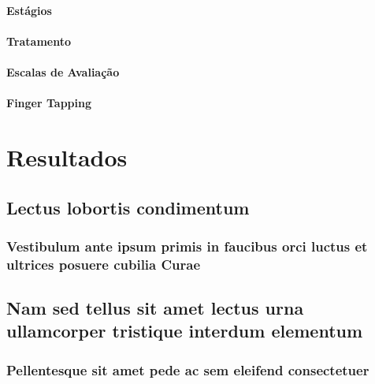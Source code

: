 \documentclass[
	12pt,				%
	openany,			%
	oneside,			%
	a4paper,			%
	english,			%
	french,				%
	spanish,			%
	brazil				%
	]{abntex2}
\begin{document}
\subsection{Estágios}
\subsection{Tratamento}
\subsection{Escalas de Avaliação}

\subsection{Finger Tapping}

\part{Resultados}

\chapter{Lectus lobortis condimentum}

\section{Vestibulum ante ipsum primis in faucibus orci luctus et ultrices
posuere cubilia Curae}

\lipsum[21-22]

\chapter{Nam sed tellus sit amet lectus urna ullamcorper tristique interdum
elementum}

\section{Pellentesque sit amet pede ac sem eleifend consectetuer}

\lipsum[24]

\end{document}
